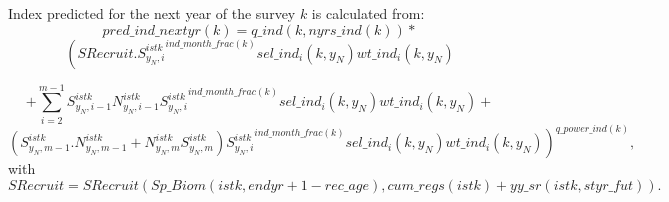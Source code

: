 \documentclass{article}
\begin{document}
Index predicted for the next year of the survey $k$ is calculated from:
\begin{equation}
    pred\_ind\_nextyr(k)=q\_ind(k,nyrs\_ind(k)) * 
\end{equation}
\begin{equation*}
    \left( SRecruit. {S^{istk}_{y_N,i}}^{ind\_month\_frac(k)} sel\_ind_i(k,y_N)  wt\_ind_i(k,y_N)\right.
\end{equation*}

\begin{equation}
+\sum_{i=2}^{m-1}S^{istk}_{y_N,i-1}N^{istk}_{y_N,i-1}{S^{istk}_{y_N,i}}^{ind\_month\_frac(k)} sel\_ind_i(k,y_N)  wt\_ind_i(k,y_N)+
\end{equation}
\begin{equation*}
  \left. (S^{istk}_{y_N,m-1}.N^{istk}_{y_N,m-1}+N^{istk}_{y_N,m}S^{istk}_{y_N,m}){S^{istk}_{y_N,i}}^{ind\_month\_frac(k)} sel\_ind_i(k,y_N)  wt\_ind_i(k,y_N) \right)^{q\_power\_ind(k)},
\end{equation*}
with
\begin{equation}
    SRecruit=SRecruit(Sp\_Biom(istk,endyr+1-rec\_age),cum\_regs(istk)+yy\_sr(istk,styr\_fut)).
\end{equation}
\end{document}
